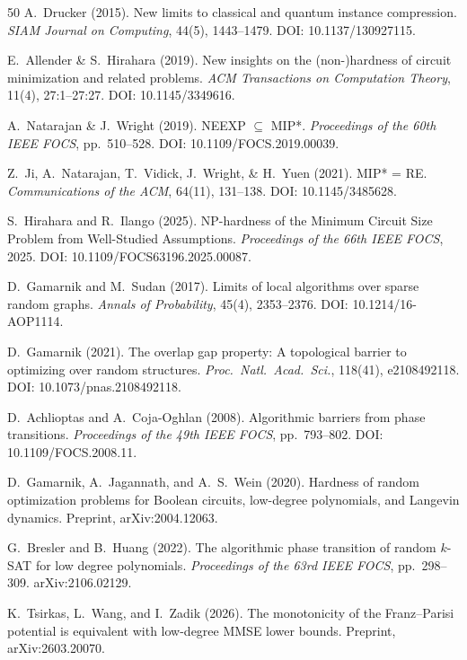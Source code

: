 \documentclass[aps,prd,twocolumn,superscriptaddress,nofootinbib]{revtex4-2}
\theoremstyle{definition}
\theoremstyle{remark}
\begin{document}
\begin{thebibliography}{50}
A.~Drucker (2015).
New limits to classical and quantum instance compression.
\textit{SIAM Journal on Computing}, 44(5), 1443--1479.
DOI: 10.1137/130927115.

E.~Allender \& S.~Hirahara (2019).
New insights on the (non-)hardness of circuit minimization and related problems.
\textit{ACM Transactions on Computation Theory}, 11(4), 27:1--27:27.
DOI: 10.1145/3349616.

A.~Natarajan \& J.~Wright (2019).
NEEXP $\subseteq$ MIP*.
\textit{Proceedings of the 60th IEEE FOCS}, pp.\ 510--528.
DOI: 10.1109/FOCS.2019.00039.

Z.~Ji, A.~Natarajan, T.~Vidick, J.~Wright, \& H.~Yuen (2021).
MIP* = RE.
\textit{Communications of the ACM}, 64(11), 131--138.
DOI: 10.1145/3485628.

S.~Hirahara and R.~Ilango (2025).
NP-hardness of the Minimum Circuit Size Problem from Well-Studied Assumptions.
\textit{Proceedings of the 66th IEEE FOCS}, 2025.
DOI: 10.1109/FOCS63196.2025.00087.

D.~Gamarnik and M.~Sudan (2017).
Limits of local algorithms over sparse random graphs.
\textit{Annals of Probability}, 45(4), 2353--2376.
DOI: 10.1214/16-AOP1114.

D.~Gamarnik (2021).
The overlap gap property: A topological barrier to optimizing over random structures.
\textit{Proc.\ Natl.\ Acad.\ Sci.}, 118(41), e2108492118.
DOI: 10.1073/pnas.2108492118.

D.~Achlioptas and A.~Coja-Oghlan (2008).
Algorithmic barriers from phase transitions.
\textit{Proceedings of the 49th IEEE FOCS}, pp.\ 793--802.
DOI: 10.1109/FOCS.2008.11.

D.~Gamarnik, A.~Jagannath, and A.~S.~Wein (2020).
Hardness of random optimization problems for Boolean circuits, low-degree polynomials, and Langevin dynamics.
Preprint, arXiv:2004.12063.

G.~Bresler and B.~Huang (2022).
The algorithmic phase transition of random $k$-SAT for low degree polynomials.
\textit{Proceedings of the 63rd IEEE FOCS}, pp.\ 298--309.
arXiv:2106.02129.

K.~Tsirkas, L.~Wang, and I.~Zadik (2026).
The monotonicity of the Franz--Parisi potential is equivalent with low-degree MMSE lower bounds.
Preprint, arXiv:2603.20070.


\end{thebibliography}
\end{document}
